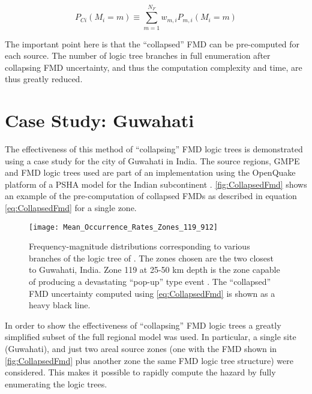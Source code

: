 \documentclass{article}
\begin{document}
\begin{equation} \label{eq:CollapsedFmd} 
P_{Ci}(M_i = m) \equiv
\sum_{m=1}^{N_F} w_{m,i} 
P_{m,i}(M_i=m) 
\end{equation}

The important point here is that the ``collapsed'' FMD can be pre-computed for each source. 
The number of logic tree branches in full enumeration after collapsing FMD uncertainty, and thus the computation complexity and time, are thus greatly reduced.

\section{Case Study: Guwahati}

The effectiveness of this method of ``collapsing'' FMD logic trees is demonstrated using a case study for the city of Guwahati in India.
The source regions, GMPE and FMD logic trees used are part of an implementation \citep{ackerley2017open} using the OpenQuake platform \citep{pagani2014openquake} of a PSHA model for the Indian subcontinent \citep{nath2012probabilistic}. 
\autoref{fig:CollapsedFmd} shows an example of the pre-computation of collapsed FMDs as described in equation \eqref{eq:CollapsedFmd} for a single zone.

\begin{figure}[!htb]
\begin{adjustbox}{center}
\texttt{[image: Mean\_Occurrence\_Rates\_Zones\_119\_912]}
\end{adjustbox}
\caption[Frequency-magnitude distributions for two zones nearest to Guwahati, India]{Frequency-magnitude distributions corresponding to various branches of the logic tree of \cite{nath2012probabilistic}. 
The zones chosen are the two closest to Guwahati, India. 
Zone 119 at 25-50 km depth is the zone capable of producing a devastating ``pop-up'' type event \citep{Bilham2001, nath2012ground}. 
The ``collapsed'' FMD uncertainty computed using \eqref{eq:CollapsedFmd} is shown as a heavy black line.} 
\label{fig:CollapsedFmd}
\end{figure}

In order to show the effectiveness of ``collapsing'' FMD logic trees a greatly simplified subset of the full regional model was used.
In particular, a single site (Guwahati), and just two areal source zones (one with the FMD shown in \autoref{fig:CollapsedFmd} plus another zone the same FMD logic tree structure) were considered.
This makes it possible to rapidly compute the hazard by fully enumerating the logic trees.
\end{document}
